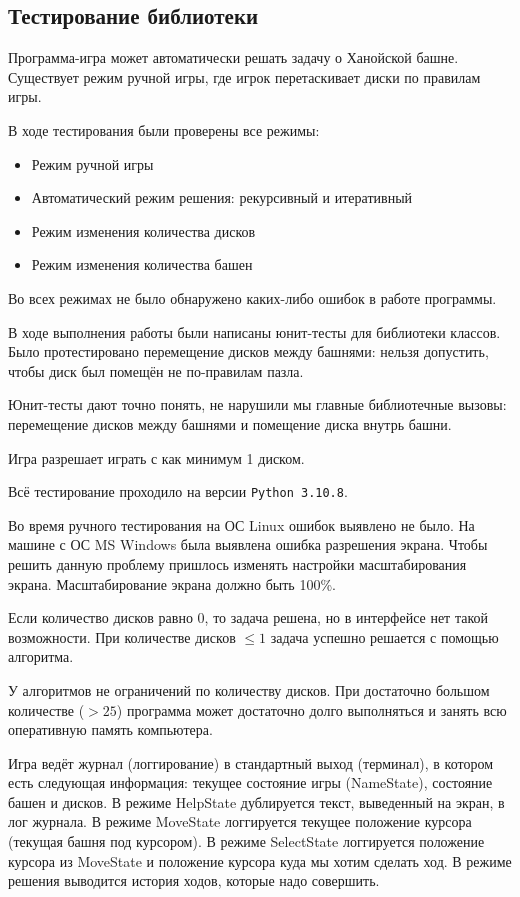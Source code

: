 \subsection{Тестирование библиотеки}

Программа-игра может автоматически решать задачу о Ханойской башне. Существует
режим ручной игры, где игрок перетаскивает диски по правилам игры. 

В ходе тестирования были проверены все режимы:

\begin{itemize}
  \item Режим ручной игры
  \item Автоматический режим решения: рекурсивный и итеративный
  \item Режим изменения количества дисков
  \item Режим изменения количества башен
\end{itemize}

Во всех режимах не было обнаружено каких-либо ошибок в работе программы.

В ходе выполнения работы были написаны юнит-тесты для библиотеки классов.
Было протестировано перемещение дисков между башнями: нельзя допустить, чтобы
диск был помещён не по-правилам пазла.

Юнит-тесты дают точно понять, не нарушили мы главные библиотечные вызовы:
перемещение дисков между башнями и помещение диска внутрь башни.

Игра разрешает играть с как минимум 1 диском.

Всё тестирование проходило на версии \verb|Python 3.10.8|.

Во время ручного тестирования на ОС Linux ошибок выявлено не было.
На машине с ОС MS Windows была выявлена ошибка разрешения экрана.
Чтобы решить данную проблему пришлось изменять настройки масштабирования экрана.
Масштабирование экрана должно быть 100\%.

Если количество дисков равно 0, то задача решена, но в интерфейсе нет такой
возможности. При количестве дисков $\le 1$ задача успешно решается с
помощью алгоритма.

У алгоритмов не ограничений по количеству дисков. При достаточно большом
количестве ($>25$) программа может достаточно долго выполняться и занять всю
оперативную память компьютера.

Игра ведёт журнал (логгирование) в стандартный выход (терминал), в котором есть
следующая информация: текущее состояние игры (NameState), состояние башен и
дисков. В режиме HelpState дублируется текст, выведенный на экран, в лог
журнала. В режиме MoveState логгируется текущее положение курсора (текущая
башня под курсором). В режиме SelectState логгируется положение курсора из
MoveState и положение курсора куда мы хотим сделать ход. В режиме решения
выводится история ходов, которые надо совершить.

